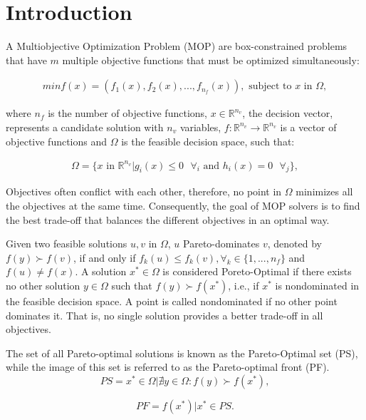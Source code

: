 \section{Introduction}\label{intro}

A Multiobjective Optimization Problem (MOP)  are box-constrained problems that have $m$ multiple objective functions that must be optimized simultaneously:

\begin{align}\label{min_problem}
min f(x) = (f_1(x), f_2(x), ..., f_{n_f}(x)), \text{ subject to $x$ in $\Omega$},
\end{align}

where ${n_f}$ is the number of objective functions, $x \in \mathbb{R}^{n_v}$, the decision vector, represents a candidate solution with ${n_v}$ variables, $f: \mathbb{R}^{n_v} \rightarrow \mathbb{R}^{n_v}$ is a vector of objective functions and $\Omega$ is the feasible decision space, such that:

\begin{align}
	\Omega =\{x \text{ in } \mathbb{R}^{n_v} | g_i(x) \leq 0 \text{ } \forall_i \text{ and } h_i(x) = 0 \text{ } \forall_j \},
\end{align}

Objectives often conflict with each other, therefore, no point in $\Omega$ minimizes all the objectives at the same time. Consequently, the goal of MOP solvers is to find the best trade-off that balances the different objectives in an optimal way.


Given two feasible solutions $u, v$ in $\Omega$, $u$  Pareto-dominates $v$, denoted by $f(y) \succ f(v)$, if and only if $f_k(u) \leq f_k(v), \forall_k \in \{1,..., n_f\}$ and $ f(u) \neq f(x)$. A solution $x^* \in \Omega$ is considered Poreto-Optimal if there exists no other solution $y \in \Omega$ such that $f(y) \succ f(x^*)$, i.e., if $x^*$ is nondominated in the feasible decision space. A point is called nondominated if no other point dominates it. That is, no single solution provides a better trade-off in all objectives.

The set of all Pareto-optimal solutions is known as the Pareto-Optimal set (PS), while the image of this set is referred to as the Pareto-optimal front (PF).\\

\begin{equation}
	PS = {x^* \in \Omega | \nexists y \in \Omega : f(y) \succ f(x^*)  },
\end{equation}

\begin{equation}
	PF = {f(x^*) | x^* \in PS }.
\end{equation}
